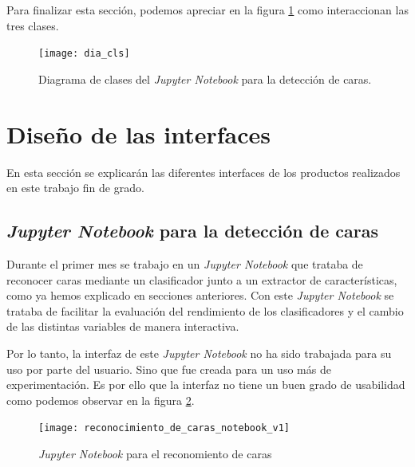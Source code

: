 Para finalizar esta sección, podemos apreciar en la figura \ref{fig:C.4.6} como interaccionan las tres clases.

\begin{figure}[h]
\centering
\texttt{[image: dia\_cls]}
\caption{Diagrama de clases del \textit{Jupyter Notebook} para la detección de caras.}
\label{fig:C.4.6}
\end{figure}

\section{Diseño de las interfaces}

En esta sección se explicarán las diferentes interfaces de los productos realizados en este trabajo fin de grado.

\subsection{\textit{Jupyter Notebook} para la detección de caras}

Durante el primer mes se trabajo en un \textit{Jupyter Notebook} que trataba de reconocer caras mediante un clasificador junto a un extractor de características, como ya hemos explicado en secciones anteriores. Con este \textit{Jupyter Notebook} se trataba de facilitar la evaluación del rendimiento de los clasificadores y el cambio de las distintas variables de manera interactiva. 

Por lo tanto, la interfaz de este \textit{Jupyter Notebook} no ha sido trabajada para su uso por parte del usuario. Sino que fue creada para un uso más de experimentación. Es por ello que la interfaz no tiene un buen grado de usabilidad como podemos observar en la figura \ref{fig:C.5.1}.

\begin{figure}[h]
\centering
\texttt{[image: reconocimiento\_de\_caras\_notebook\_v1]}
\caption{\textit{Jupyter Notebook} para el reconomiento de caras}
\label{fig:C.5.1}
\end{figure}

